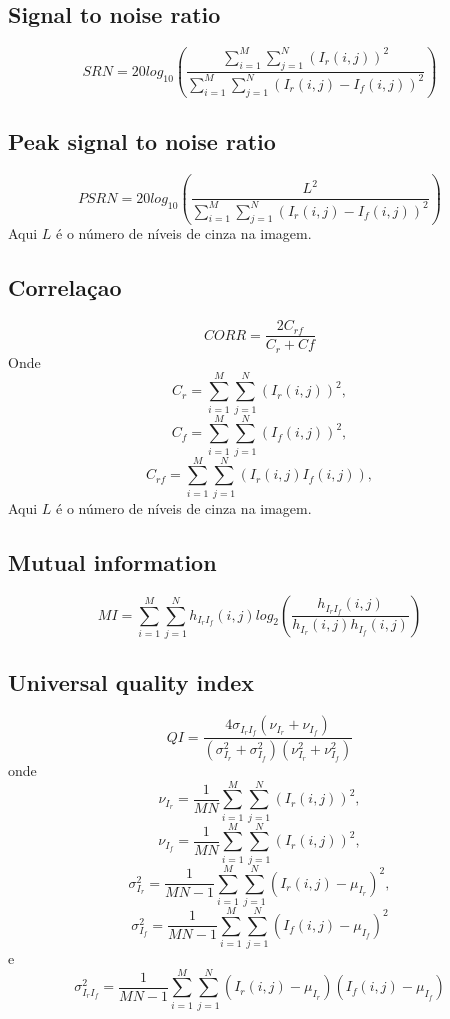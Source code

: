 \documentclass[conference]{IEEEtran}
\begin{document}
\subsection{Signal to noise ratio}
\begin{equation}
SRN = 20log_{10}\left(\frac{\sum_{i=1}^M\sum_{j=1}^N(I_r(i,j))^2}{\sum_{i=1}^M\sum_{j=1}^N(I_r(i,j)-I_f(i,j))^2}\right)
\end{equation}
\subsection{Peak signal to noise ratio}
\begin{equation}
PSRN = 20log_{10}\left(\frac{L^2}{\sum_{i=1}^M\sum_{j=1}^N(I_r(i,j)-I_f(i,j))^2}\right)
\end{equation}
Aqui $L$ é o número de níveis de cinza na imagem. 
\subsection{Correlaçao}
\begin{equation}
CORR = \frac{2C_{rf}}{C_r+Cf}
\end{equation}
Onde $$C_r= \sum_{i=1}^M\sum_{j=1}^N(I_r(i,j))^2,$$ $$C_f=\sum_{i=1}^M\sum_{j=1}^N(I_f(i,j))^2,$$ $$C_{rf}=\sum_{i=1}^M\sum_{j=1}^N(I_r(i,j)I_f(i,j)),$$
Aqui $L$ é o número de níveis de cinza na imagem. 

\subsection{Mutual information}
\begin{equation}
MI = \sum_{i=1}^M\sum_{j=1}^N h_{I_rI_f}(i,j){log_2\left(\frac{h_{I_rI_f}(i,j)}{h_{I_r}(i,j)h_{I_f}(i,j)}\right)}
\end{equation}
\subsection{Universal quality index}
\begin{equation}
QI=\frac{4\sigma_{I_rI_f}(\nu_{I_r}+\nu_{I_f})}{(\sigma_{I_r}^2+\sigma_{I_f}^2)(\nu_{I_r}^2+\nu_{I_f}^2)}
\end{equation}
onde 
$$\nu_{I_r}=\frac{1}{MN}\sum_{i=1}^M\sum_{j=1}^N(I_r(i,j))^2,$$
$$\nu_{I_f}=\frac{1}{MN}\sum_{i=1}^M\sum_{j=1}^N(I_r(i,j))^2,$$ $$\sigma_{I_r}^2=\frac{1}{MN-1}\sum_{i=1}^M\sum_{j=1}^N(I_r(i,j)-\mu_{I_r})^2,$$
$$\sigma_{I_f}^2   =\frac{1}{MN-1}\sum_{i=1}^M\sum_{j=1}^N(I_f(i,j)-\mu_{I_f})^2$$ e
$$\sigma_{I_rI_f}^2=\frac{1}{MN-1}\sum_{i=1}^M\sum_{j=1}^N(I_r(i,j)-\mu_{I_r})(I_f(i,j)-\mu_{I_f})$$ 
\end{document}
